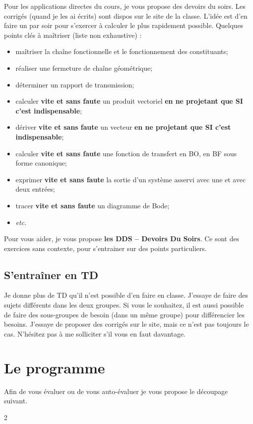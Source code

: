 Pour les applications directes du cours, je vous propose des devoirs du soirs. Les corrigés (quand je les ai écrits) sont dispos sur le site de la classe. L'idée est d'en faire un par soir pour s'exercer à calculer le plus rapidement possible. Quelques points clés à maîtriser (liste non exhaustive) : 
\begin{itemize}
\item maîtriser la chaîne fonctionnelle et le fonctionnement des constituants;
\item réaliser une fermeture de chaîne géométrique;
\item déterminer un rapport de transmission;
\item calculer \textbf{vite et sans faute} un produit vectoriel \textbf{en ne projetant que SI c'est indispensable};
\item dériver \textbf{vite et sans faute} un vecteur \textbf{en ne projetant que SI c'est indispensable};
\item calculer \textbf{vite et sans faute} une fonction de transfert en BO, en BF sous forme canonique;
\item exprimer \textbf{vite et sans faute} la sortie d'un système asservi avec une et avec deux entrées;
\item tracer \textbf{vite et sans faute} un diagramme de Bode;
\item \textit{etc.}
\end{itemize}

Pour vous aider, je vous propose \textbf{les DDS -- Devoirs Du Soirs}. Ce sont des exercices sans contexte, pour s'entrainer sur des points particuliers.

\subsection{S'entraîner en TD}
Je donne plus de TD qu'il n'est possible d'en faire en classe. J'essaye de faire des sujets différents dans les deux groupes. Si vous le souhaitez, il est aussi possible de faire des sous-groupes de besoin (dans un même groupe) pour différencier les besoins.
J'essaye de proposer des corrigés sur le site, mais ce n'est pas toujours le cas. N'hésitez pas à me solliciter s'il vous en faut davantage. 



\section{Le programme}

Afin de vous évaluer ou de vous auto-évaluer je vous propose le découpage suivant.

\footnotesize
\begin{multicols}{2}
\allCompWide
\end{multicols}